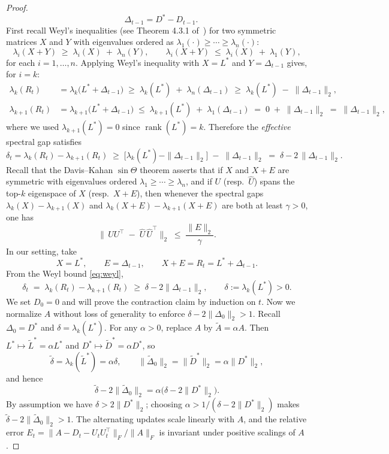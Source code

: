 \documentclass[final,hidelinks,onefignum,onetabnum]{siamart250211}
\providecommand{\1}{\mathbf{1}}
\theoremstyle{plain}
\DeclareMathOperator{\rank}{rank}
\begin{document}
\begin{proof}
\[\quad
\Delta_{t-1} = D^* - D_{t-1}.
\]
First recall Weyl’s inequalities (see Theorem 4.3.1 of~\cite{horn2012matrix}) for two symmetric matrices \(X\) and \(Y\) with eigenvalues ordered as
\(\lambda_1(\cdot)\ge\cdots\ge\lambda_n(\cdot)\):
\[
\lambda_i(X+Y)\;\ge\;\lambda_i(X)\;+\;\lambda_n(Y),
\qquad
\lambda_i(X+Y)\;\le\;\lambda_i(X)\;+\;\lambda_1(Y),
\]
for each \(i=1,\dots,n\).  
Applying Weyl’s inequality with \(X=L^*\) and \(Y=\Delta_{t-1}\) gives, for \(i=k\):
\begin{align}
\lambda_k(R_t)
&= \lambda_k\bigl(L^* + \Delta_{t-1}\bigr)
\;\ge\;
\lambda_k(L^*) \;+\;\lambda_n(\Delta_{t-1})
\;\ge\;
\lambda_k(L^*) \;-\;\|\Delta_{t-1}\|_2,
\label{eq:weyl1}\\
\lambda_{k+1}(R_t)
&= \lambda_{k+1}\bigl(L^* + \Delta_{t-1}\bigr)
\;\le\;
\lambda_{k+1}(L^*) \;+\;\lambda_1(\Delta_{t-1})
\;=\;
0 \;+\;\|\Delta_{t-1}\|_2
\;=\;
\|\Delta_{t-1}\|_2,
\label{eq:weyl2}
\end{align}
where we used \(\lambda_{k+1}(L^*)=0\) since \(\rank(L^*)=k\). Therefore the \emph{effective} spectral gap satisfies
\begin{equation} \label{eq:weyl}
    \delta_t
=\lambda_k(R_t) - \lambda_{k+1}(R_t)
\;\ge\;
\bigl[\lambda_k(L^*) - \|\Delta_{t-1}\|_2\bigr]
\;-\;\|\Delta_{t-1}\|_2
\;=\;
\delta - 2\,\|\Delta_{t-1}\|_2.    
\end{equation}
Recall that the Davis–Kahan \(\sin\Theta\) theorem \cite{davis1970rotation} asserts that if \(X\) and \(X+E\) are symmetric with eigenvalues ordered \(\lambda_1\ge\cdots\ge\lambda_n\), and if \(U\) (resp.\ \(\widehat U\)) spans the top-\(k\) eigenspace of \(X\) (resp.\ \(X+E\)), then whenever the spectral gaps
\(\lambda_k(X)-\lambda_{k+1}(X)\) and \(\lambda_k(X+E)-\lambda_{k+1}(X+E)\) are both at least \(\gamma>0\), one has
\[
\bigl\|\,U U^\top \;-\;\widehat U\,\widehat U^\top\bigr\|_2
\;\le\;
\frac{\|E\|_2}{\gamma}.
\]
In our setting, take
\[
X=L^*,\qquad E=\Delta_{t-1},\qquad X+E=R_t=L^*+\Delta_{t-1}.
\]
From the Weyl bound \eqref{eq:weyl},
\begin{equation}
\label{eq:weyl_gap}
\delta_t
\;=\;
\lambda_k(R_t) - \lambda_{k+1}(R_t)
\;\ge\;
\delta - 2\|\Delta_{t-1}\|_2,
\qquad
\delta := \lambda_k(L^*) > 0.
\end{equation}
We set \(D_0 = 0\) and will prove the contraction claim by induction on \(t\).
Now we normalize \(A\) without loss of generality to enforce \(\delta - 2\|\Delta_0\|_2 > 1\).
Recall \(\Delta_0 = D^\ast\) and \(\delta = \lambda_k(L^\ast)\). 
For any \(\alpha > 0\), replace \(A\) by \(\widetilde A = \alpha A\).
Then \(L^\ast \mapsto \widetilde L^\ast = \alpha L^\ast\) and \(D^\ast \mapsto \widetilde D^\ast = \alpha D^\ast\), so
\[
\widetilde\delta = \lambda_k(\widetilde L^\ast) = \alpha\delta,
\qquad
\|\widetilde\Delta_0\|_2 = \|\widetilde D^\ast\|_2 = \alpha\|D^\ast\|_2,
\]
and hence
\[
\widetilde\delta - 2\|\widetilde\Delta_0\|_2
= \alpha\bigl(\delta - 2\|D^\ast\|_2\bigr).
\]
By assumption we have \(\delta>2\|D^\ast\|_2\); choosing
\(\alpha>1/(\delta-2\|D^\ast\|_2)\) makes \(\widetilde\delta-2\|\widetilde\Delta_0\|_2>1\).
The alternating updates scale linearly with \(A\), and the relative error
\(E_t=\|A-D_t-U_tU_t^\top\|_F/\|A\|_F\) is invariant under positive scalings of \(A\).


\end{proof}
\end{document}
